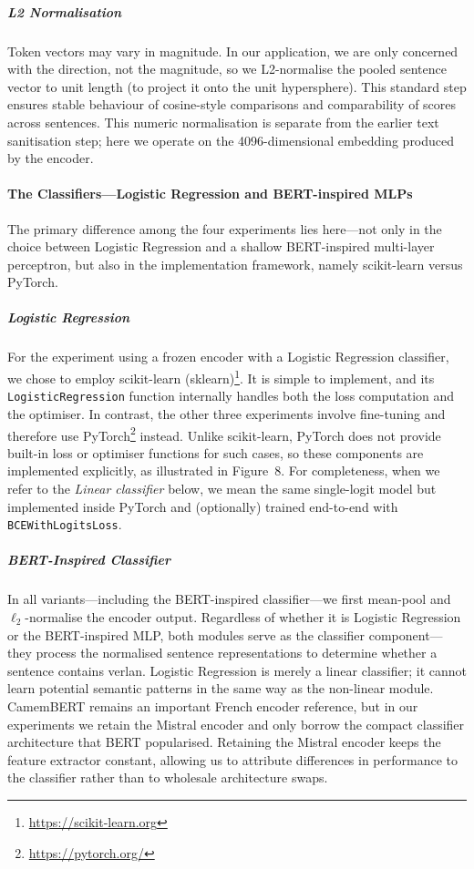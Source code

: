 \documentclass[12pt]{article}
\begin{document}
%
\subparagraph{L2 Normalisation}
Token vectors may vary in magnitude. In our application, we are only concerned with the direction, not the magnitude, so we L2-normalise the pooled sentence vector to unit length (to project it onto the unit hypersphere). This standard step ensures stable behaviour of cosine-style comparisons and comparability of scores across sentences. This numeric normalisation is separate from the earlier text sanitisation step; here we operate on the 4096-dimensional embedding produced by the encoder.

\paragraph{The Classifiers\;---\;Logistic Regression and BERT-inspired MLPs}
The primary difference among the four experiments lies here\;---\;not only in the choice between Logistic Regression and a shallow BERT-inspired multi-layer perceptron, but also in the implementation framework, namely scikit-learn versus PyTorch.

\subparagraph{Logistic Regression}
For the experiment using a frozen encoder with a Logistic Regression classifier, we chose to employ scikit-learn (sklearn)\footnote{\url{https://scikit-learn.org}}. 
It is simple to implement, and its \texttt{LogisticRegression} function internally handles both the loss computation and the optimiser. 
In contrast, the other three experiments involve fine-tuning and therefore use PyTorch\footnote{\url{https://pytorch.org/}} instead. 
Unlike scikit-learn, PyTorch does not provide built-in loss or optimiser functions for such cases, so these components are implemented explicitly, as illustrated in Figure~8. 
For completeness, when we refer to the \textit{Linear classifier} below, we mean the same single-logit model but implemented inside PyTorch and (optionally) trained end-to-end with \texttt{BCEWithLogitsLoss}.

\subparagraph{BERT-Inspired Classifier}
In all variants\;---\;including the BERT-inspired classifier\;---\;we first mean-pool and $\ell_2$-normalise the encoder output.
Regardless of whether it is Logistic Regression or the BERT-inspired MLP, both modules serve as the classifier component\;---\;they process the normalised sentence representations to determine whether a sentence contains verlan.
Logistic Regression is merely a linear classifier; it cannot learn potential semantic patterns in the same way as the non-linear module. 
CamemBERT remains an important French encoder reference, but in our experiments we retain the Mistral encoder and only borrow the compact classifier architecture that BERT popularised. Retaining the Mistral encoder keeps the feature extractor constant, allowing us to attribute differences in performance to the classifier rather than to wholesale architecture swaps.
\end{document}
